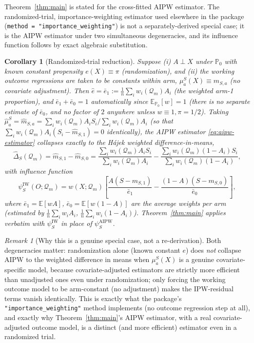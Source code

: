 \documentclass[11pt]{article}
\theoremstyle{plain}
\newtheorem{corollary}[theorem]{Corollary}
\theoremstyle{definition}
\theoremstyle{remark}
\newtheorem{remark}[theorem]{Remark}
\newcommand{\E}{\mathbb{E}}
\newcommand{\PP}{\mathbb{P}}
\newcommand{\Q}{\mathcal{Q}}
\newcommand{\ehat}{\widehat{e}}
\begin{document}
Theorem~\ref{thm:main} is stated for the cross-fitted AIPW estimator. The
randomized-trial, importance-weighting estimator used elsewhere in the package
(\texttt{method = "importance\_weighting"}) is not a separately-derived special case;
it is the AIPW estimator under two simultaneous degeneracies, and its influence
function follows by exact algebraic substitution.

\begin{corollary}[Randomized-trial reduction]\label{cor:rct}
Suppose (i) $A\perp X$ under $\PP_0$ with known constant propensity $e(X)\equiv\pi$
(randomization), and (ii) the working outcome regressions are taken to be constants
within arm, $\mu_a^S(X)\equiv m_{S,a}$ (no covariate adjustment). Then $\ehat=\bar
e_1:=\frac1n\sum_iw_i(\Q_m)A_i$ (the weighted arm-1 proportion), and $\bar e_1+\bar
e_0=1$ automatically since $\E_{\PP_0}[w]=1$ (there is no separate estimate of
$\bar e_0$, and no factor of $2$ anywhere unless $w\equiv1,\pi=1/2$). Taking
$\hat\mu_a^S=\hat m_{S,a}=\sum_iw_i(\Q_m)A_i S_i/\sum_iw_i(\Q_m)A_i$ (so that
$\sum_iw_i(\Q_m)A_i(S_i-\hat m_{S,1})=0$ identically), the AIPW estimator
\eqref{eq:aipw-estimator} collapses \emph{exactly} to the Hájek weighted
difference-in-means,
\begin{equation}\label{eq:iw-estimator}
    \hat\Delta_S(\Q_m) = \hat m_{S,1}-\hat m_{S,0}
    = \frac{\sum_i w_i(\Q_m)A_iS_i}{\sum_i w_i(\Q_m)A_i}
    - \frac{\sum_i w_i(\Q_m)(1-A_i)S_i}{\sum_i w_i(\Q_m)(1-A_i)},
\end{equation}
with influence function
\begin{equation}\label{eq:psi-iw}
    \psi_S^{\mathrm{IW}}(O;\Q_m) = w(X;\Q_m)\left[
        \frac{A(S-m_{S,1})}{\bar e_1} - \frac{(1-A)(S-m_{S,0})}{\bar e_0}
    \right],
\end{equation}
where $\bar e_1=\E[wA]$, $\bar e_0=\E[w(1-A)]$ are the average weights per arm
(estimated by $\frac1n\sum_iw_iA_i$, $\frac1n\sum_iw_i(1-A_i)$). Theorem~\ref{thm:main}
applies verbatim with $\psi_S^{\mathrm{IW}}$ in place of $\psi_S^{\mathrm{AIPW}}$.
\end{corollary}

\begin{remark}[Why this is a genuine special case, not a re-derivation]\label{rem:rct-scope}
Both degeneracies matter: randomization alone (known constant $e$) does \emph{not}
collapse AIPW to the weighted difference in means when $\mu_a^S(X)$ is a genuine
covariate-specific model, because covariate-adjusted estimators are strictly more
efficient than unadjusted ones even under randomization; only forcing the working
outcome model to be arm-constant (no adjustment) makes the IPW-residual terms vanish
identically. This is exactly what the package's \texttt{"importance\_weighting"}
method implements (no outcome regression step at all), and exactly why
Theorem~\ref{thm:main}'s AIPW estimator, with a real covariate-adjusted outcome model,
is a distinct (and more efficient) estimator even in a randomized trial.
\end{remark}
\end{document}

